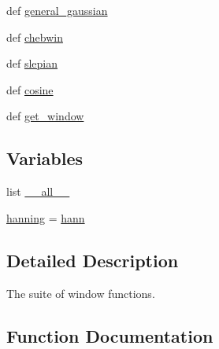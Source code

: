 \begin{DoxyCompactItemize}
\item 
def \hyperlink{namespacescipy_1_1signal_1_1windows_afbcbe2852cec2fbfe892d0a2d3a92c67}{general\+\_\+gaussian}
\item 
def \hyperlink{namespacescipy_1_1signal_1_1windows_ac1451f3270b47990da454007577fab72}{chebwin}
\item 
def \hyperlink{namespacescipy_1_1signal_1_1windows_a29a36e1e151cfa31a9ce7238de3da0b0}{slepian}
\item 
def \hyperlink{namespacescipy_1_1signal_1_1windows_a5af9f464d48182a53361bbda52a3acea}{cosine}
\item 
def \hyperlink{namespacescipy_1_1signal_1_1windows_ae19f5ed49910fb07ffda192777d02b0f}{get\+\_\+window}
\end{DoxyCompactItemize}
\subsection*{Variables}
\begin{DoxyCompactItemize}
\item 
list \hyperlink{namespacescipy_1_1signal_1_1windows_a6076af085b01d29a5b5da48e38b8a281}{\+\_\+\+\_\+all\+\_\+\+\_\+}
\item 
\hyperlink{namespacescipy_1_1signal_1_1windows_afbc14fc8f8fc91f08c82a1674fd0087b}{hanning} = \hyperlink{namespacescipy_1_1signal_1_1windows_a25f492c76fc589606b17d08ceb04bafd}{hann}
\end{DoxyCompactItemize}


\subsection{Detailed Description}
\begin{DoxyVerb}The suite of window functions.\end{DoxyVerb}
 

\subsection{Function Documentation}
\hypertarget{namespacescipy_1_1signal_1_1windows_a7883d59937f93c12d04fa2681c464736}{}
